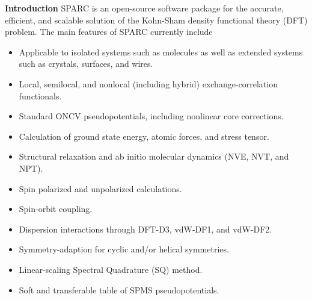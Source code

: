 \begin{frame}[allowframebreaks]{\textbf{Introduction}} \label{Introduction}
  SPARC is an open-source software package for the accurate, efficient, and scalable solution of the Kohn-Sham density functional theory (DFT) problem. The main features of SPARC currently include
  \begin{itemize}
    \item Applicable to isolated systems such as molecules as well as extended systems such as crystals, surfaces, and wires.
    \item Local, semilocal, and nonlocal (including hybrid) exchange-correlation functionals.
    \item Standard ONCV pseudopotentials, including nonlinear core corrections.
    \item Calculation of ground state energy, atomic forces, and stress tensor.
    \item Structural relaxation and ab initio molecular dynamics (NVE, NVT, and NPT).
    \item Spin polarized and unpolarized calculations.
    \item Spin-orbit coupling.
    \item Dispersion interactions through DFT-D3, vdW-DF1, and vdW-DF2.
    \item Symmetry-adaption for cyclic and/or helical symmetries.
    \item Linear-scaling Spectral Quadrature (SQ) method.
    \item Soft and transferable table of SPMS pseudopotentials.
  \end{itemize}
  
  \end{frame}

